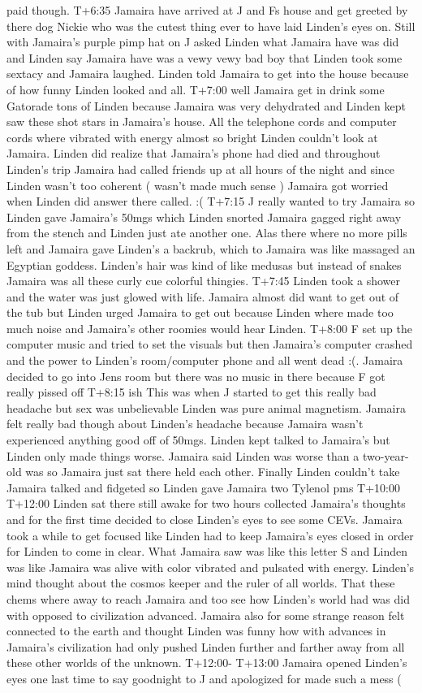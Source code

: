 \documentclass[12pt]{book}
\begin{document}
paid though. T+6:35 Jamaira have arrived at J and Fs house and get greeted by there dog Nickie who was the cutest thing ever to have laid Linden's eyes on. Still with Jamaira's purple pimp hat on J asked Linden what Jamaira have was did and Linden say Jamaira have was a vewy vewy bad boy that Linden took some sextacy and Jamaira laughed. Linden told Jamaira to get into the house because of how funny Linden looked and all. T+7:00 well Jamaira get in drink some Gatorade tons of Linden because Jamaira was very dehydrated and Linden kept saw these shot stars in Jamaira's house. All the telephone cords and computer cords where vibrated with energy almost so bright Linden couldn't look at Jamaira. Linden did realize that Jamaira's phone had died and throughout Linden's trip Jamaira had called friends up at all hours of the night and since Linden wasn't too coherent ( wasn't made much sense ) Jamaira got worried when Linden did answer there called. :( T+7:15 J really wanted to try Jamaira so Linden gave Jamaira's 50mgs which Linden snorted Jamaira gagged right away from the stench and Linden just ate another one. Alas there where no more pills left and Jamaira gave Linden's a backrub, which to Jamaira was like massaged an Egyptian goddess. Linden's hair was kind of like medusas but instead of snakes Jamaira was all these curly cue colorful thingies. T+7:45 Linden took a shower and the water was just glowed with life. Jamaira almost did want to get out of the tub but Linden urged Jamaira to get out because Linden where made too much noise and Jamaira's other roomies would hear Linden. T+8:00 F set up the computer music and tried to set the visuals but then Jamaira's computer crashed and the power to Linden's room/computer phone and all went dead :(. Jamaira decided to go into Jens room but there was no music in there because F got really pissed off T+8:15 ish This was when J started to get this really bad headache but sex was unbelievable Linden was pure animal magnetism. Jamaira felt really bad though about Linden's headache because Jamaira wasn't experienced anything good off of 50mgs. Linden kept talked to Jamaira's but Linden only made things worse. Jamaira said Linden was worse than a two-year-old was so Jamaira just sat there held each other. Finally Linden couldn't take Jamaira talked and fidgeted so Linden gave Jamaira two Tylenol pms T+10:00 T+12:00 Linden sat there still awake for two hours collected Jamaira's thoughts and for the first time decided to close Linden's eyes to see some CEVs. Jamaira took a while to get focused like Linden had to keep Jamaira's eyes closed in order for Linden to come in clear. What Jamaira saw was like this letter S and Linden was like Jamaira was alive with color vibrated and pulsated with energy. Linden's mind thought about the cosmos keeper and the ruler of all worlds. That these chems where away to reach Jamaira and too see how Linden's world had was did with opposed to civilization advanced. Jamaira also for some strange reason felt connected to the earth and thought Linden was funny how with advances in Jamaira's civilization had only pushed Linden further and farther away from all these other worlds of the unknown. T+12:00- T+13:00 Jamaira opened Linden's eyes one last time to say goodnight to J and apologized for made such a mess ( 
\end{document}
